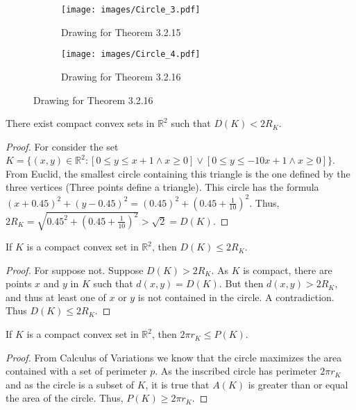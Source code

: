         \begin{figure}[H]
          \begin{subfigure}[b]{0.49\textwidth}
             \centering
            \texttt{[image: images/Circle\_3.pdf]}
            \caption{Drawing for Theorem 3.2.15}
          \end{subfigure}
          \begin{subfigure}[b]{0.49\textwidth}
            \centering
            \texttt{[image: images/Circle\_4.pdf]}
            \caption{Drawing for Theorem 3.2.16}
          \end{subfigure}
        \end{figure}
        \begin{theorem}
        There exist compact convex sets in $\mathbb{R}^2$ such that $D(K) < 2R_K$.
        \end{theorem}
        \begin{proof}
        For consider the set $K=\{(x,y)\in \mathbb{R}^2: [0\leq y\leq x+1 \land x\geq 0]\lor [0\leq y\leq -10x+1\land x\geq 0]\}$. From Euclid, the smallest circle containing this triangle is the one defined by the three vertices (Three points define a triangle). This circle has the formula $(x+0.45)^2+(y-0.45)^2 = (0.45)^2 +(0.45+\frac{1}{10})^2$. Thus, $2R_K = \sqrt{0.45^2 +(0.45+\frac{1}{10})^2} > \sqrt{2} = D(K)$.
        \end{proof}
        \begin{theorem}
        If $K$ is a compact convex set in $\mathbb{R}^2$, then $D(K) \leq 2R_K$.
        \end{theorem}
        \begin{proof}
        For suppose not. Suppose $D(K) > 2R_K$. As $K$ is compact, there are points $x$ and $y$ in $K$ such that $d(x,y)=D(K)$. But then $d(x,y)>2R_K$, and thus at least one of $x$ or $y$ is not contained in the circle. A contradiction. Thus $D(K)\leq 2R_K$.
        \end{proof}
        \begin{theorem}
        If $K$ is a compact convex set in $\mathbb{R}^2$, then $2\pi r_K \leq P(K)$.
        \end{theorem}
        \begin{proof}
        From Calculus of Variations we know that the circle maximizes the area contained with a set of perimeter $p$. As the inscribed circle has perimeter $2\pi r_K$ and as the circle is a subset of $K$, it is true that $A(K)$ is greater than or equal the area of the circle. Thus, $P(K)\geq 2\pi r_K$.
        \end{proof}
